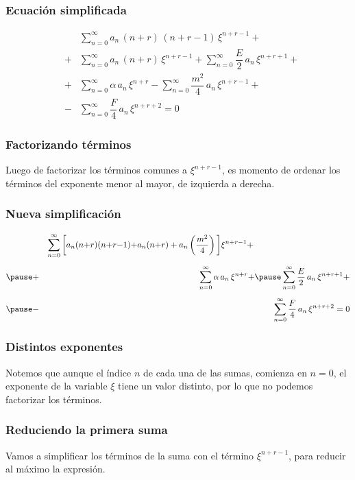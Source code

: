 \documentclass[12pt]{beamer}
\begin{document}
\begin{frame}
\frametitle{Ecuación simplificada}
\vspace{-1cm}
\begin{eqnarray*}
&{}& \sum_{n=0}^{\infty} a_{n} \, (n {+} r) \, (n {+} r {-} 1) \, \xi^{n{+}r{-}1} + \\[0.5em]
&+& \sum_{n=0}^{\infty} a_{n} \, (n {+} r) \, \xi^{n{+}r{-}1} + \sum_{n=0}^{\infty} \dfrac{E}{2} \, a_{n} \, \xi^{n{+}r{+}1} + \\[0.5em]
&+& \sum_{n=0}^{\infty} \alpha \, a_{n} \, \xi^{n{+}r} - \sum_{n=0}^{\infty}  \dfrac{m^{2}}{4} \, a_{n} \, \xi^{n{+}r{-}1} + \\[0.5em]
&-& \sum_{n=0}^{\infty} \dfrac{F}{4} \, a_{n} \, \xi^{n{+}r{+}2} = 0
\end{eqnarray*}
\end{frame}
\begin{frame}
\frametitle{Factorizando términos}
Luego de factorizar los términos comunes a $\xi^{n+r-1}$, es momento de ordenar los términos del exponente menor al mayor, de izquierda a derecha.
\end{frame}
\begin{frame}
\frametitle{Nueva simplificación}
\vspace{-1cm}
\begin{eqnarray*}
&{}& \sum_{n=0}^{\infty} \bigg[ a_{n} (n {+} r) (n {+} r {-} 1) {+} a_{n} (n {+} r) + a_{n} \left( \dfrac{m^{2}}{4} \right) \bigg] \xi^{n+r-1} + \hspace*{4cm} \\[0.5em] \pause
&{+}&  \sum_{n=0}^{\infty} \alpha \, a_{n} \, \xi^{n+r} {+} \pause \sum_{n=0}^{\infty} \dfrac{E}{2} \, a_{n} \, \xi^{n+r+1} + \\[0.5em] \pause
&{-}& \sum_{n=0}^{\infty} \dfrac{F}{4} \, a_{n} \, \xi^{n+r+2} = 0
\end{eqnarray*}
\end{frame}
\begin{frame}
\frametitle{Distintos exponentes}
Notemos que aunque el índice $n$ de cada una de las sumas, comienza en $n=0$, el exponente de la variable $\xi$ tiene un valor distinto, por lo que no podemos factorizar los términos.
\end{frame}
\begin{frame}
\frametitle{Reduciendo la primera suma}
Vamos a simplificar los términos de la suma con el término  $\xi^{n+r-1}$, para reducir al máximo la expresión.
\end{frame}
\end{document}
